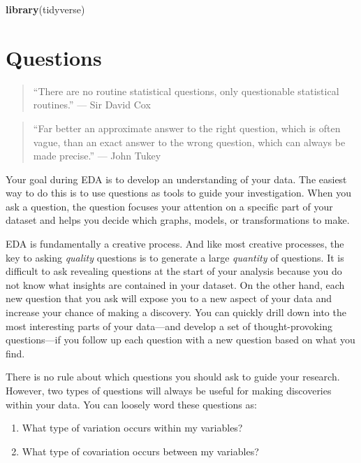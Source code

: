 \documentclass[]{book}
\newenvironment{Shaded}{\begin{snugshade}}{\end{snugshade}}
\newcommand{\KeywordTok}[1]{\textcolor[rgb]{0.13,0.29,0.53}{\textbf{{#1}}}}
\newcommand{\NormalTok}[1]{{#1}}
\begin{document}
\begin{Shaded}
\begin{Highlighting}[]
\KeywordTok{library}\NormalTok{(tidyverse)}
\end{Highlighting}
\end{Shaded}

\section{Questions}\label{questions}

\begin{quote}
``There are no routine statistical questions, only questionable
statistical routines.'' --- Sir David Cox
\end{quote}

\begin{quote}
``Far better an approximate answer to the right question, which is often
vague, than an exact answer to the wrong question, which can always be
made precise.'' --- John Tukey
\end{quote}

Your goal during EDA is to develop an understanding of your data. The
easiest way to do this is to use questions as tools to guide your
investigation. When you ask a question, the question focuses your
attention on a specific part of your dataset and helps you decide which
graphs, models, or transformations to make.

EDA is fundamentally a creative process. And like most creative
processes, the key to asking \emph{quality} questions is to generate a
large \emph{quantity} of questions. It is difficult to ask revealing
questions at the start of your analysis because you do not know what
insights are contained in your dataset. On the other hand, each new
question that you ask will expose you to a new aspect of your data and
increase your chance of making a discovery. You can quickly drill down
into the most interesting parts of your data---and develop a set of
thought-provoking questions---if you follow up each question with a new
question based on what you find.

There is no rule about which questions you should ask to guide your
research. However, two types of questions will always be useful for
making discoveries within your data. You can loosely word these
questions as:

\begin{enumerate}
\def\labelenumi{\arabic{enumi}.}
\item
  What type of variation occurs within my variables?
\item
  What type of covariation occurs between my variables?
\end{enumerate}
\end{document}

